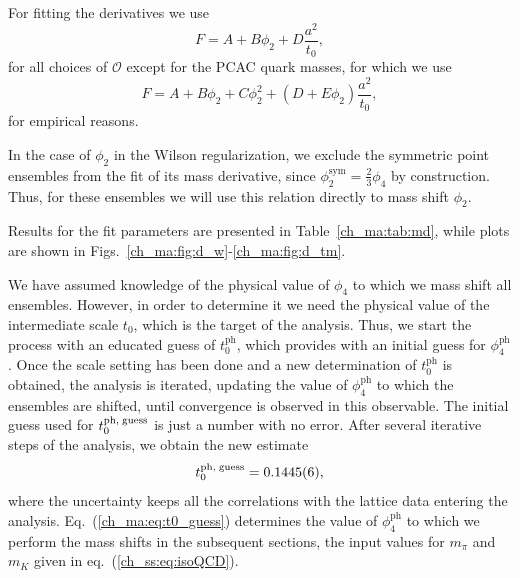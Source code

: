 For fitting the derivatives we use
\begin{equation}
\label{ch_ma:eq:md_1}
F=A+B\phi_2+D\frac{a^2}{t_0},
\end{equation}
for all choices of $\mathcal{O}$ except for the PCAC quark masses, for which we use
\begin{equation}
\label{ch_ma:eq:md_2}
F=A+B\phi_2+C\phi_2^2+(D+E\phi_2)\frac{a^2}{t_0},
\end{equation}
for empirical reasons.

In the case of $\phi_2$ in the Wilson regularization, we exclude the symmetric point ensembles from the fit of its mass derivative, since $\phi_2^{\textrm{sym}}=\frac{2}{3}\phi_4$ by construction. Thus, for these ensembles we will use this relation directly to mass shift $\phi_2$.

Results for the fit parameters are presented in Table~\ref{ch_ma:tab:md}, while plots are shown in Figs.~\ref{ch_ma:fig:d_w}-\ref{ch_ma:fig:d_tm}.

We have assumed knowledge of the physical value of $\phi_4$ to which we mass shift all ensembles. However, in order to determine it we need the physical value of the intermediate scale $t_0$, which is the target of the analysis. Thus, we start the process with an educated guess of $t_0^{\textrm{ph}}$, which provides with an initial guess for $\phi_4^{\textrm{ph}}$. Once the scale setting has been done and a new determination of $t_0^{\textrm{ph}}$ is obtained, the analysis is iterated, updating the value of $\phi_4^{\textrm{ph}}$ to which the ensembles are shifted, until convergence is observed in this observable. The initial guess used for $t_0^{\textrm{ph,\;guess}}$ is just a number with no error. After several iterative steps of the analysis, we obtain the new estimate
\begin{equation}
\label{ch_ma:eq:t0_guess}
t_0^{\textrm{ph,\;guess}}=0.1445(6),
\end{equation}
where the uncertainty keeps all the correlations with the lattice data entering the analysis. Eq.~(\ref{ch_ma:eq:t0_guess}) determines the value of $\phi_4^{\textrm{ph}}$ to which we perform the mass shifts in the subsequent sections, the input values for $m_{\pi}$ and $m_K$ given in eq.~(\ref{ch_ss:eq:isoQCD}). 

